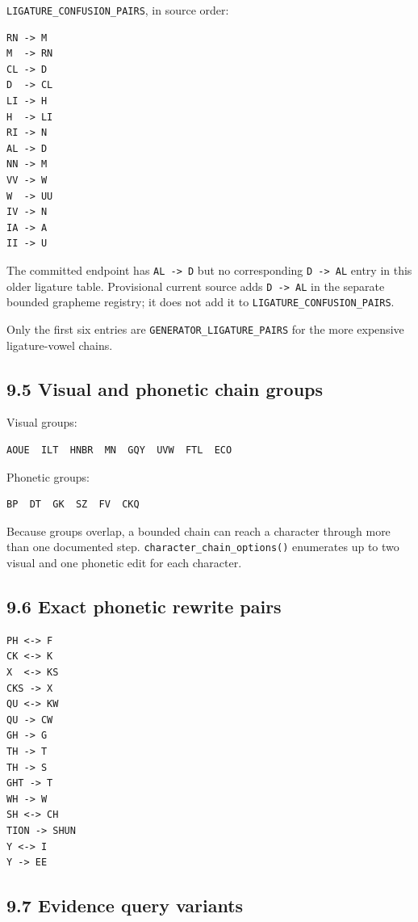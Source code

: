 \texttt{LIGATURE\_\allowbreak{}CONFUSION\_\allowbreak{}PAIRS}, in source order:

\begin{verbatim}
RN -> M
M  -> RN
CL -> D
D  -> CL
LI -> H
H  -> LI
RI -> N
AL -> D
NN -> M
VV -> W
W  -> UU
IV -> N
IA -> A
II -> U
\end{verbatim}

The committed endpoint has \texttt{AL\ -\textgreater{}\ D} but no corresponding \texttt{D\ -\textgreater{}\ AL} entry in this older ligature table. Provisional current source adds \texttt{D\ -\textgreater{}\ AL} in the separate bounded grapheme registry; it does not add it to \texttt{LIGATURE\_\allowbreak{}CONFUSION\_\allowbreak{}PAIRS}.

Only the first six entries are \texttt{GENERATOR\_\allowbreak{}LIGATURE\_\allowbreak{}PAIRS} for the more expensive ligature-vowel chains.

\subsection{9.5 Visual and phonetic chain groups}\label{95-visual-and-phonetic-chain-groups}

Visual groups:

\begin{verbatim}
AOUE  ILT  HNBR  MN  GQY  UVW  FTL  ECO
\end{verbatim}

Phonetic groups:

\begin{verbatim}
BP  DT  GK  SZ  FV  CKQ
\end{verbatim}

Because groups overlap, a bounded chain can reach a character through more than one documented step. \texttt{character\_\allowbreak{}chain\_\allowbreak{}options()} enumerates up to two visual and one phonetic edit for each character.

\subsection{9.6 Exact phonetic rewrite pairs}\label{96-exact-phonetic-rewrite-pairs}

\begin{verbatim}
PH <-> F
CK <-> K
X  <-> KS
CKS -> X
QU <-> KW
QU -> CW
GH -> G
TH -> T
TH -> S
GHT -> T
WH -> W
SH <-> CH
TION -> SHUN
Y <-> I
Y -> EE
\end{verbatim}

\subsection{9.7 Evidence query variants}\label{97-evidence-query-variants}

